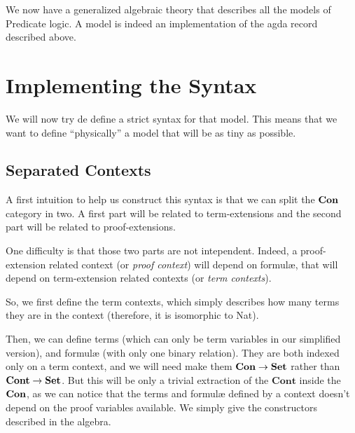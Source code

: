 \documentclass[10pt,a4paper]{article}
\begin{document}
			\begin{tcolorbox}
				\vspace{-2ex}
				\agdasep
				\agdasep
				\agdasep
				\agdasep
				\vspace{-7.5ex}
			\end{tcolorbox}
		
			We now have a generalized algebraic theory that describes all the models of Predicate logic. A model is indeed an implementation of the agda record described above.
			
	\section{Implementing the Syntax}
	
		We will now try de define a strict syntax for that model. This means that we want to define \enquote{physically} a model that will be as tiny as possible.
		
		\subsection{Separated Contexts}
		
			A first intuition to help us construct this syntax is that we can split the $\textbf{Con}$ category in two. A first part will be related to term-extensions and the second part will be related to proof-extensions.
			
			One difficulty is that those two parts are not intependent. Indeed, a proof-extension related context (or \emph{proof context}) will depend on formulæ, that will depend on term-extension related contexts (or \emph{term contexts}).
		
			So, we first define the term contexts, which simply describes how many terms they are in the context (therefore, it is isomorphic to Nat).
			\begin{tcolorbox}
				\vspace{-2ex}
				\agda{agda/ICont.tex}
				\vspace{-7.5ex}
			\end{tcolorbox}
		
			Then, we can define terms (which can only be term variables in our simplified version), and formulæ (with only one binary relation). They are both indexed only on a term context, and we will need make them $\textbf{Con} \rightarrow \textbf{Set}$ rather than $\textbf{Cont} \rightarrow \textbf{Set}$. But this will be only a trivial extraction of the $\textbf{Cont}$ inside the $\textbf{Con}$, as we can notice that the terms and formulæ defined by a context doesn't depend on the proof variables available. We simply give the constructors described in the algebra.
			
\end{document}
